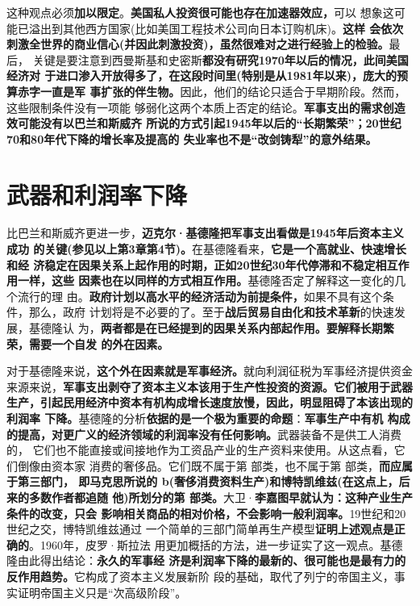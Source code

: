这种观点必须\textbf{加以限定}。\textbf{美国私人投资很可能也存在加速器效应，}可以
想象这可能已溢出到其他西方国家(比如美国工程技术公司向日本订购机床)。\textbf{这样
  会依次刺激全世界的商业信心(并因此刺激投资)，虽然很难对之进行经验上的检验。}最后，
关键是要注意到西曼斯基和史密斯\textbf{都没有研究1970年以后的情况，此间美国经济对
  于进口渗入开放得多了，在这段时间里(特别是从1981年以来)，庞大的预算赤字一直是军
  事扩张的伴生物。}因此，他们的结论只适合于早期阶段。然而，这些限制条件没有一项能
够弱化这两个本质上否定的结论。\textbf{军事支出的需求创造效可能没有以巴兰和斯威齐
  所说的方式引起1945年以后的“长期繁荣”；20世纪70和80年代下降的增长率及提高的
  失业率也不是“改剑铸犁”的意外结果。}

\section{武器和利润率下降}
比巴兰和斯威齐更进一步，\textbf{迈克尔·基德隆把军事支出看做是1945年后资本主义成功
  的关键(参见以上第3章第4节)。}在基德隆看来，\textbf{它是一个高就业、快速增长和经
  济稳定在因果关系上起作用的时期，正如20世纪30年代停滞和不稳定相互作用一样，这些
  因素也在以同样的方式相互作用。}基德隆否定了解释这一变化的几个流行的理
由。\textbf{政府计划以高水平的经济活动为前提条件，}如果不具有这个条件，那么，政府
计划将是不必要的了。至于\textbf{战后贸易自由化和技术革新}的快速发展，基德隆认
为，\textbf{两者都是在已经提到的因果关系内部起作用。要解释长期繁荣，需要一个自发
  的外在因素。}

对于基德隆来说，\textbf{这个外在因素就是军事经济。}就向利润征税为军事经济提供资金
来源来说，\textbf{军事支出剥夺了资本主义本该用于生产性投资的资源。它们被用于武器
  生产，引起民用经济中资本有机构成增长速度放慢，因此，明显阻碍了本该出现的利润率
  下降。}基德隆的分析\textbf{依据的是一个极为重要的命题}：\textbf{军事生产中有机
  构成的提高，对更广义的经济领域的利润率没有任何影响。}武器装备不是供工人消费的，
它们也不能直接或间接地作为工资品产业的生产资料来使用。从这点看，它们倒像由资本家
消费的奢侈品。它们既不属于第 部类，也不属于第 部类，\textbf{而应属于第三部门，
  即马克思所说的 b(奢侈消费资料生产)和博特凯维兹(在这点上，后来的多数作者都追随
  他)所划分的第 部类。}大卫·\textbf{李嘉图早就认为：这种产业生产条件的改变，只会
  影响相关商品的相对价格，不会影响一般利润率。}19世纪和20世纪之交，博特凯维兹通过
一个简单的三部门简单再生产模型\textbf{证明上述观点是正确的}。1960年，皮罗·斯拉法
用更加概括的方法，进一步证实了这一观点。基德隆由此得出结论：\textbf{永久的军事经
  济是利润率下降的最新的、很可能也是最有力的反作用趋势。}它构成了资本主义发展新阶
段的基础，取代了列宁的帝国主义，事实证明帝国主义只是“次高级阶段”。

